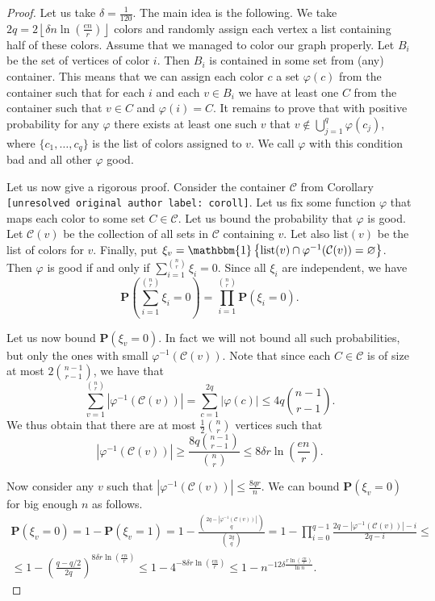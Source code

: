 \documentclass[10pt,a4paper]{article}
\theoremstyle{remark}
\theoremstyle{definition}
\newcommand{\mP}{\mathbf{P}}
\newcommand{\lst}{\mathrm{list}}
\newcommand{\ind}[1]{\mathbbm{1}\left\{#1\right\}}
\newcommand{\skob}[1]{\left(#1\right)}
\newcommand{\flr}[1]{\left\lfloor#1\right\rfloor}
\begin{document}
\begin{proof}
    	Let us take $\delta = \frac{1}{120}$. The main idea is the following. We take $2q = 2\flr{\delta n \ln\skob{\frac{en}{r}}}$ colors and randomly assign each vertex a list containing half of these colors. Assume that we managed to color our graph properly. Let $B_i$ be the set of vertices of color $i$. Then $B_i$ is contained in some set from (any) container. This means that we can assign each color $c$ a set $\varphi(c)$ from the container such that for each $i$ and each $v \in B_i$ we have at least one $C$ from the container such that $v \in C$ and $\varphi(i) = C$. It remains to prove that with positive probability for any $\varphi$ there exists at least one such $v$ that $v \notin \bigcup_{j = 1}^{q} \varphi(c_j)$, where $\{c_1, \dotsc, c_q\}$ is the list of colors assigned to $v$. We call $\varphi$ with this condition bad and all other $\varphi$ good.

    	Let us now give a rigorous proof. Consider the container $\mathcal{C}$ from Corollary \texttt{[unresolved original author label: coroll]}. Let us fix some function $\varphi$ that maps each color to some set $C \in \mathcal{C}$. Let us bound the probability that $\varphi$ is good. Let $\mathcal{C}(v)$ be the collection of all sets in $\mathcal{C}$ containing $v$. Let also $\lst(v)$ be the list of colors for $v$. Finally, put $\xi_v = \ind{\lst(v) \cap \varphi^{-1}(\mathcal{C}(v)) = \varnothing}$. Then $\varphi$ is good if and only if $\sum_{i =1}^{\binom{n}{r}}\xi_i = 0$. Since all $\xi_i$ are independent, we have
    	$$
		\mP\skob{\sum_{i = 1}^{\binom{n}{r}}\xi_i = 0} = \prod_{i = 1}^{\binom{n}{r}}\mP(\xi_i = 0).
    	$$

    	Let us now bound $\mP(\xi_v = 0)$. In fact we will not bound all such probabilities, but only the ones with small $\varphi^{-1}(\mathcal{C}(v))$. Note that since each $C \in \mathcal{C}$ is of size at most $2\binom{n-1}{r-1}$, we have that 
    	$$
    		\sum_{v = 1}^{\binom{n}{r}}|\varphi^{-1}(\mathcal{C}(v))| = \sum_{c = 1}^{2q}|\varphi(c)| \leq 4q\binom{n-1}{r-1}.
    	$$
    	We thus obtain that there are at most $\frac{1}{2}\binom{n}{r}$ vertices such that 
    	$$
    		|\varphi^{-1}(\mathcal{C}(v))| \geq \frac{8q\binom{n-1}{r-1}}{\binom{n}{r}} \leq 8\delta r \ln\skob{\frac{en}{r}}.
    	$$

	Now consider any $v$ such that $|\varphi^{-1}(\mathcal{C}(v))| \leq  \frac{8qr}{n}$. We can bound $\mP(\xi_v = 0)$ for big enough $n$ as follows.
    	\begin{multline*}
		\mP(\xi_v = 0) = 1- \mP(\xi_v = 1) = 1 -\frac{\binom{2q-|\varphi^{-1}(\mathcal{C}(v))|}{q}}{\binom{2q}{q}} = 1 -\prod_{i = 0}^{q-1}\frac{2q-|\varphi^{-1}(\mathcal{C}(v))| - i}{2q-i} \leq \\ \leq 1 - \skob{\frac{q - q/2}{2q}}^{ 8\delta r \ln\skob{\frac{en}{r}}} \leq 1 - 4^{-8\delta r \ln\skob{\frac{en}{r}}} \leq 1 - n^{-12\delta\frac{r\ln\skob{\frac{en}{r}}}{\ln n}}. 
    	\end{multline*}


\end{proof}
\end{document}

